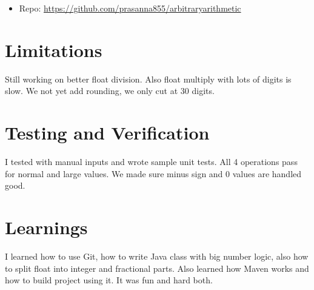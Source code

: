 \documentclass[12pt]{article}
\begin{document}
\begin{itemize}
\item Repo: \url{https://github.com/prasanna855/arbitraryarithmetic}
\end{itemize}

\begin{center}
\end{center}

\section*{Limitations}
Still working on better float division. Also float multiply with lots of digits is slow. We not yet add rounding, we only cut at 30 digits.

\section*{Testing and Verification}
I tested with manual inputs and wrote sample unit tests. All 4 operations pass for normal and large values. We made sure minus sign and 0 values are handled good.

\section*{Learnings}
I learned how to use Git, how to write Java class with big number logic, also how to split float into integer and fractional parts. Also learned how Maven works and how to build project using it. It was fun and hard both.
\end{document}
